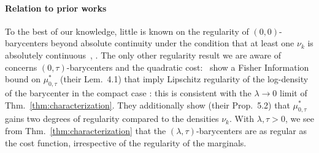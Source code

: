 \documentclass[11pt]{article}
\newcommand{\rev}[1]{{#1}}
\begin{document}
\paragraph{Relation to prior works} To the best of our knowledge, little is known on the regularity of $(0,0)$-barycenters beyond absolute continuity under the condition that at least one $\nu_k$ is absolutely continuous~\cite{agueh2011barycenters}, \cite[Thm.~5.1]{kim2017wasserstein}. The only other regularity result we are aware of concerns $(0,\tau)$-barycenters and the quadratic cost:~\cite{carlier2021entropic} show a Fisher Information bound on $\mu^*_{0,\tau}$ (their Lem.~4.1) that imply Lipschitz regularity \rev{of the log-density of the barycenter} in the compact case : this is consistent with the $\lambda\to 0$ limit of Thm.~\ref{thm:characterization}. They additionally show (their Prop.~5.2) that $\mu^*_{0,\tau}$  gains two degrees of regularity compared to the densities $\nu_k$. With $\lambda,\tau>0$, we see from Thm.~\ref{thm:characterization} that the $(\lambda,\tau)$-barycenters are as regular as the cost function, irrespective of the regularity of the marginals.
\end{document}
